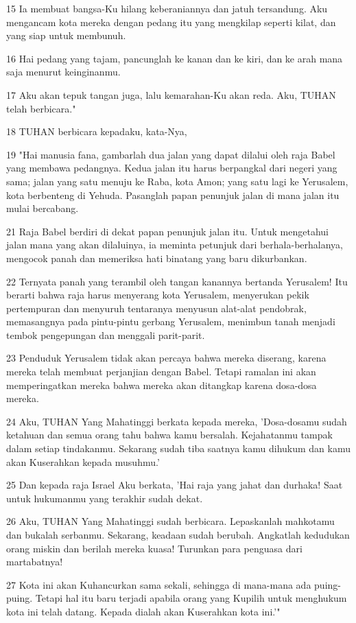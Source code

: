 \par 15 Ia membuat bangsa-Ku hilang keberaniannya dan jatuh tersandung. Aku mengancam kota mereka dengan pedang itu yang mengkilap seperti kilat, dan yang siap untuk membunuh.
\par 16 Hai pedang yang tajam, pancunglah ke kanan dan ke kiri, dan ke arah mana saja menurut keinginanmu.
\par 17 Aku akan tepuk tangan juga, lalu kemarahan-Ku akan reda. Aku, TUHAN telah berbicara."
\par 18 TUHAN berbicara kepadaku, kata-Nya,
\par 19 "Hai manusia fana, gambarlah dua jalan yang dapat dilalui oleh raja Babel yang membawa pedangnya. Kedua jalan itu harus berpangkal dari negeri yang sama; jalan yang satu menuju ke Raba, kota Amon; yang satu lagi ke Yerusalem, kota berbenteng di Yehuda. Pasanglah papan penunjuk jalan di mana jalan itu mulai bercabang.
\par 21 Raja Babel berdiri di dekat papan penunjuk jalan itu. Untuk mengetahui jalan mana yang akan dilaluinya, ia meminta petunjuk dari berhala-berhalanya, mengocok panah dan memeriksa hati binatang yang baru dikurbankan.
\par 22 Ternyata panah yang terambil oleh tangan kanannya bertanda Yerusalem! Itu berarti bahwa raja harus menyerang kota Yerusalem, menyerukan pekik pertempuran dan menyuruh tentaranya menyusun alat-alat pendobrak, memasangnya pada pintu-pintu gerbang Yerusalem, menimbun tanah menjadi tembok pengepungan dan menggali parit-parit.
\par 23 Penduduk Yerusalem tidak akan percaya bahwa mereka diserang, karena mereka telah membuat perjanjian dengan Babel. Tetapi ramalan ini akan memperingatkan mereka bahwa mereka akan ditangkap karena dosa-dosa mereka.
\par 24 Aku, TUHAN Yang Mahatinggi berkata kepada mereka, 'Dosa-dosamu sudah ketahuan dan semua orang tahu bahwa kamu bersalah. Kejahatanmu tampak dalam setiap tindakanmu. Sekarang sudah tiba saatnya kamu dihukum dan kamu akan Kuserahkan kepada musuhmu.'
\par 25 Dan kepada raja Israel Aku berkata, 'Hai raja yang jahat dan durhaka! Saat untuk hukumanmu yang terakhir sudah dekat.
\par 26 Aku, TUHAN Yang Mahatinggi sudah berbicara. Lepaskanlah mahkotamu dan bukalah serbanmu. Sekarang, keadaan sudah berubah. Angkatlah kedudukan orang miskin dan berilah mereka kuasa! Turunkan para penguasa dari martabatnya!
\par 27 Kota ini akan Kuhancurkan sama sekali, sehingga di mana-mana ada puing-puing. Tetapi hal itu baru terjadi apabila orang yang Kupilih untuk menghukum kota ini telah datang. Kepada dialah akan Kuserahkan kota ini.'"
